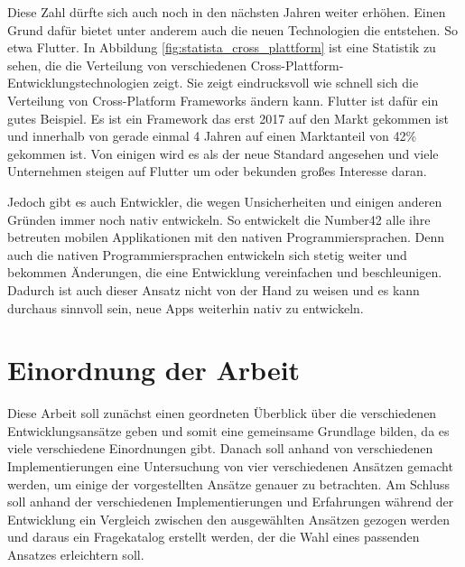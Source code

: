 Diese Zahl dürfte sich auch noch in den nächsten Jahren weiter erhöhen. Einen Grund dafür bietet unter anderem auch die neuen Technologien die entstehen. So etwa Flutter. In Abbildung \ref{fig:statista_cross_plattform} ist eine Statistik zu sehen, die die Verteilung von verschiedenen Cross-Plattform-Entwicklungstechnologien zeigt. Sie zeigt eindrucksvoll wie schnell sich die Verteilung von Cross-Platform Frameworks ändern kann. Flutter ist dafür ein gutes Beispiel. Es ist ein Framework das erst 2017 auf den Markt gekommen ist und innerhalb von gerade einmal 4 Jahren auf einen Marktanteil von 42\% gekommen ist. Von einigen wird es als der neue Standard angesehen und viele Unternehmen steigen auf Flutter um oder bekunden großes Interesse daran. 

Jedoch gibt es auch Entwickler, die wegen Unsicherheiten und einigen anderen Gründen immer noch nativ entwickeln. So entwickelt die Number42 alle ihre betreuten mobilen Applikationen mit den nativen Programmiersprachen. Denn auch die nativen Programmiersprachen entwickeln sich stetig weiter und bekommen Änderungen, die eine Entwicklung vereinfachen und beschleunigen. Dadurch ist auch dieser Ansatz nicht von der Hand zu weisen und es kann durchaus sinnvoll sein, neue Apps weiterhin nativ zu entwickeln.

\section{Einordnung der Arbeit}
Diese Arbeit soll zunächst einen geordneten Überblick über die verschiedenen Entwicklungsansätze geben und somit eine gemeinsame Grundlage bilden, da es viele verschiedene Einordnungen gibt.
Danach soll anhand von verschiedenen Implementierungen eine Untersuchung von vier verschiedenen Ansätzen gemacht werden, um einige der vorgestellten Ansätze genauer zu betrachten.
Am Schluss soll anhand der verschiedenen Implementierungen und Erfahrungen während der Entwicklung ein Vergleich zwischen den ausgewählten Ansätzen gezogen werden und daraus ein Fragekatalog erstellt werden, der die Wahl eines passenden Ansatzes erleichtern soll.


